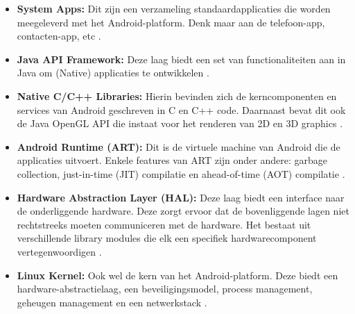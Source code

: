 \begin{itemize}
  \item \textbf{System Apps:} Dit zijn een verzameling standaardapplicaties die worden meegeleverd met het Android-platform. Denk maar aan de telefoon-app, contacten-app, etc \autocite{Bron7}.

  \item \textbf{Java API Framework:} Deze laag biedt een set van functionaliteiten aan in Java om (Native) applicaties te ontwikkelen \autocite{Bron7}.

  \item \textbf{Native C/C++ Libraries:} Hierin bevinden zich de kerncomponenten en services van Android geschreven in C en C++ code. Daarnaast bevat dit ook de Java OpenGL API die instaat voor het renderen van 2D en 3D graphics \autocite{Bron7}.

  \item \textbf{Android Runtime (ART):} Dit is de virtuele machine van Android die de applicaties uitvoert. Enkele features van ART zijn onder andere: garbage collection, just-in-time (JIT) compilatie en ahead-of-time (AOT) compilatie \autocite{Bron7}.

  \item \textbf{Hardware Abstraction Layer (HAL):} Deze laag biedt een interface naar de onderliggende hardware. Deze zorgt ervoor dat de bovenliggende lagen niet rechtstreeks moeten communiceren met de hardware. Het bestaat uit verschillende library modules die elk een specifiek hardwarecomponent vertegenwoordigen \autocite{Bron7}.

  \item \textbf{Linux Kernel:} Ook wel de kern van het Android-platform. Deze biedt een hardware-abstractielaag, een beveiligingsmodel, process management, geheugen management en een netwerkstack \autocite{Bron7}.
\end{itemize}




